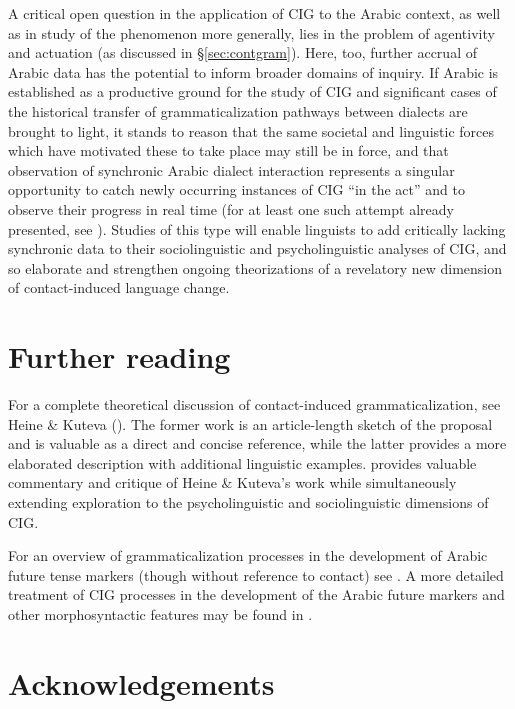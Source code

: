\documentclass[output=paper]{langsci/langscibook}
\begin{document}
A critical open question in the application of CIG to the Arabic context, as well as in study of the phenomenon more generally, lies in the problem of agentivity and actuation (as discussed in §\ref{sec:contgram}). Here, too, further accrual of Arabic data has the potential to inform broader domains of inquiry. If Arabic is established as a productive ground for the study of CIG and significant cases of the historical transfer of grammaticalization pathways between dialects are brought to light, it stands to reason that the same societal and linguistic forces which have motivated these to take place may still be in force, and that observation of synchronic Arabic dialect interaction represents a singular opportunity to catch newly occurring instances of CIG “in the act” and to observe their progress in real time (for at least one such attempt already presented, see \citealt{Abuamsha2016}). Studies of this type will enable linguists to add critically lacking synchronic data to their sociolinguistic and psycholinguistic analyses of CIG, and so elaborate and strengthen ongoing theorizations of a revelatory new dimension of contact-induced language change.

\section*{Further reading}

For a complete theoretical discussion of contact-induced grammaticalization, see Heine \& Kuteva (\citeyear{HeineKuteva2003,HeineKuteva2005}). The former work is an article-length sketch of the proposal and is valuable as a direct and concise reference, while the latter provides a more elaborated description with additional linguistic examples. \citet{Matras2009} provides valuable commentary and critique of Heine \& Kuteva’s work while simultaneously extending exploration to the psycholinguistic and sociolinguistic dimensions of CIG. 

For an overview of grammaticalization processes in the development of Arabic future tense markers (though without reference to contact) see \citet{Stewart1998}. A more detailed treatment of CIG processes in the development of the Arabic future markers and other morphosyntactic features may be found in \citet{Leddy-Cecere2018}.

\section*{Acknowledgements}
\end{document}
